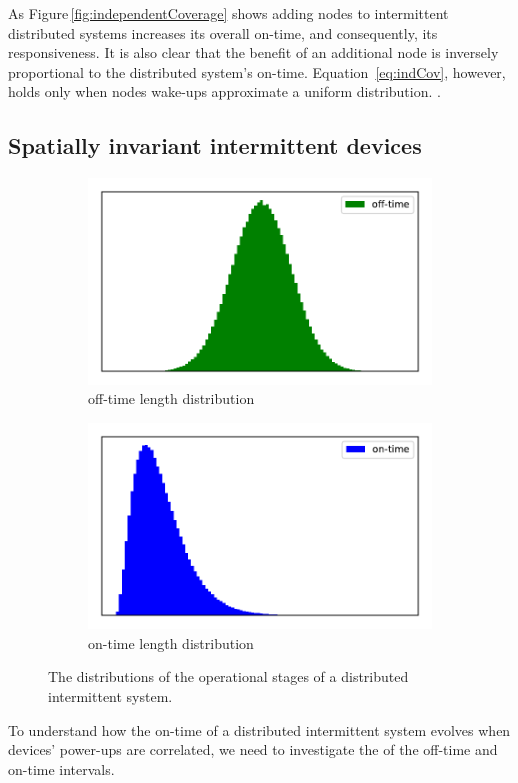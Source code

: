 As Figure\,\ref{fig:independentCoverage} shows adding nodes to intermittent distributed systems increases its overall on-time, and consequently, its responsiveness. It is also clear that the benefit of an additional node is inversely proportional to the distributed system's on-time. Equation~\ref{eq:indCov}, however, holds only when nodes wake-ups approximate a uniform distribution. . 

\subsection{Spatially invariant intermittent devices}
%
\begin{figure}
	\centering
	\begin{subfigure}[t]{0.49\columnwidth}
		\includegraphics[width=\textwidth]{figures/offtime.pdf}
			\caption{off-time length distribution}
		\label{fig:offtime}
	\end{subfigure}
	\begin{subfigure}[t]{0.49\columnwidth}
		\includegraphics[width=\textwidth]{figures/ontime.pdf}
		\caption{on-time length distribution}
		\label{fig:ontime}
	\end{subfigure}
		\caption{The distributions of the operational stages of a distributed intermittent system.}		
\end{figure}
%
To understand how the on-time of a distributed intermittent system evolves when devices' power-ups are correlated, we need to investigate the  of the off-time and on-time intervals.  

